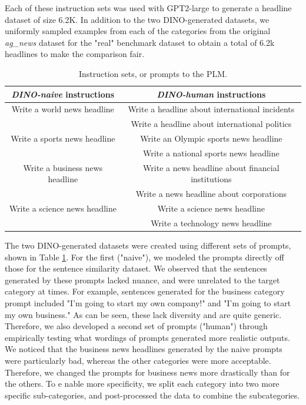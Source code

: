 \documentclass[11pt]{article}
\begin{document}
Each of these instruction sets was used with GPT2-large to generate a headline dataset of size 6.2K. In addition to the two DINO-generated datasets, we uniformly sampled examples from each of the categories from the original \textit{ag\_news} dataset for the "real" benchmark dataset to obtain a total of 6.2k headlines to make the comparison fair. 

\begin{table}[h]
    \centering
    \begin{tabular}{c|c}
        \textbf{\textit{DINO-naive} instructions} & \textbf{\textit{DINO-human} instructions} \\
        \hline
        Write a world news headline & Write a headline about international incidents \\
        & Write a headline about international politics \\
        Write a sports news headline & Write an Olympic sports news headline \\
        & Write a national sports news headline \\
        Write a business news headline & Write a news headline about financial institutions \\
        & Write a news headline about corporations \\
        Write a science news headline & Write a science news headline \\
        & Write a technology news headline \\
    \end{tabular}
    \caption{Instruction sets, or prompts to the PLM.}
    \label{tab:instructions}
\end{table}

The two DINO-generated datasets were created using different sets of prompts, shown in Table \ref{tab:instructions}. For the first ("naive"), we modeled the prompts directly off those for the sentence similarity dataset. We observed that the sentences generated by these prompts lacked nuance, and were unrelated to the target category at times. For example, sentences generated for the business category prompt included "I'm going to start my own company!" and "I'm going to start my own business." As can be seen, these lack diversity and are quite generic. Therefore, we also developed a second set of prompts ("human") through empirically testing what wordings of prompts generated more realistic outputs. We noticed that the business news headlines generated by the naive prompts were particularly bad, whereas the other categories were more acceptable. Therefore, we changed the prompts for business news more drastically than for the others. To e nable more specificity, we split each category into two more specific sub-categories, and post-processed the data to combine the subcategories. 
\end{document}
